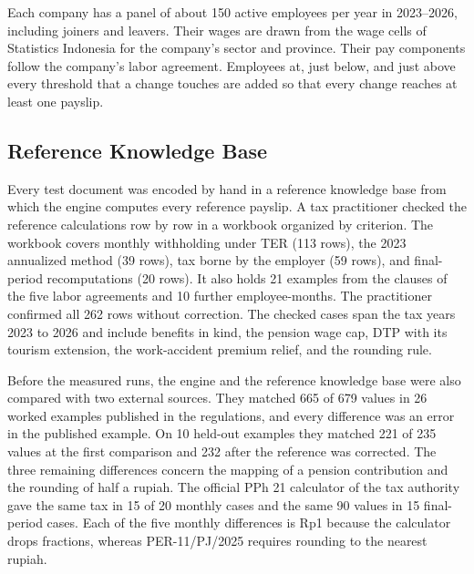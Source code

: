 Each company has a panel of about 150 active employees per year in 2023--2026, including joiners and leavers. Their wages are drawn from the wage cells of Statistics Indonesia for the company's sector and province. Their pay components follow the company's labor agreement. Employees at, just below, and just above every threshold that a change touches are added so that every change reaches at least one payslip.

\subsection{Reference Knowledge Base}
\label{sec:reference}
Every test document was encoded by hand in a reference knowledge base from which the engine computes every reference payslip. A tax practitioner checked the reference calculations row by row in a workbook organized by criterion. The workbook covers monthly withholding under TER (113 rows), the 2023 annualized method (39 rows), tax borne by the employer (59 rows), and final-period recomputations (20 rows). It also holds 21 examples from the clauses of the five labor agreements and 10 further employee-months. The practitioner confirmed all 262 rows without correction. The checked cases span the tax years 2023 to 2026 and include benefits in kind, the pension wage cap, DTP with its tourism extension, the work-accident premium relief, and the rounding rule.

Before the measured runs, the engine and the reference knowledge base were also compared with two external sources. They matched 665 of 679 values in 26 worked examples published in the regulations, and every difference was an error in the published example. On 10 held-out examples they matched 221 of 235 values at the first comparison and 232 after the reference was corrected. The three remaining differences concern the mapping of a pension contribution and the rounding of half a rupiah. The official PPh 21 calculator of the tax authority gave the same tax in 15 of 20 monthly cases and the same 90 values in 15 final-period cases. Each of the five monthly differences is Rp1 because the calculator drops fractions, whereas PER-11/PJ/2025 requires rounding to the nearest rupiah.

